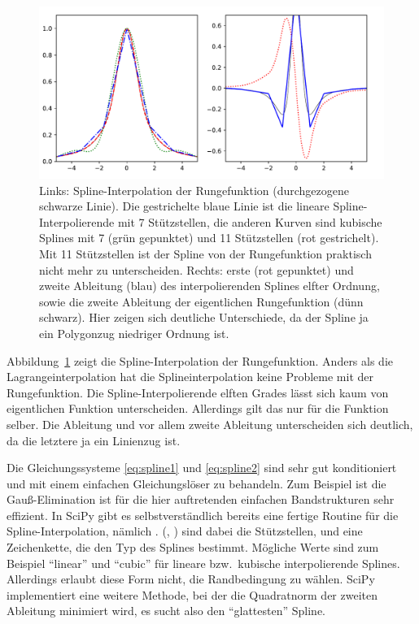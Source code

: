 \begin{figure}
  \centering
  \includegraphics[width=\textwidth]{plots/splines}
  \caption{Links: Spline-Interpolation der Rungefunktion
    (durchgezogene schwarze Linie). Die gestrichelte blaue Linie ist
    die lineare Spline-Interpolierende mit 7 Stützstellen, die anderen
    Kurven sind kubische Splines mit 7 (grün gepunktet) und 11
    Stützstellen (rot gestrichelt). Mit 11 Stützstellen ist der Spline
    von der Rungefunktion praktisch nicht mehr zu
    unterscheiden. Rechts: erste (rot gepunktet) und zweite Ableitung
    (blau) des interpolierenden Splines elfter Ordnung, sowie die
    zweite Ableitung der eigentlichen Rungefunktion (dünn
    schwarz). Hier zeigen sich deutliche Unterschiede, da der Spline
    ja ein Polygonzug niedriger Ordnung ist.}
  \label{fig:spline}
\end{figure}

Abbildung~\ref{fig:spline} zeigt die Spline-Interpolation der
Rungefunktion. Anders als die Lagrangeinterpolation hat die
Splineinterpolation keine Probleme mit der Rungefunktion. Die
Spline-Interpolierende elften Grades lässt sich kaum von eigentlichen
Funktion unterscheiden. Allerdings gilt das nur für die Funktion
selber. Die Ableitung und vor allem zweite Ableitung unterscheiden
sich deutlich, da die letztere ja ein Linienzug ist.

Die Gleichungssysteme \eqref{eq:spline1} und \eqref{eq:spline2} sind
sehr gut konditioniert und mit einem einfachen Gleichungslöser zu
behandeln.  Zum Beispiel ist die Gauß-Elimination ist für die hier
auftretenden einfachen Bandstrukturen sehr effizient. In SciPy gibt es
selbstverständlich bereits eine fertige Routine für die
Spline-Interpolation, nämlich . (, ) sind dabei die Stützstellen, und
 eine Zeichenkette, die den Typ des Splines
bestimmt. Mögliche Werte sind zum Beispiel "`linear"' und "`cubic"'
für lineare bzw.\ kubische interpolierende Splines. Allerdings erlaubt
diese Form nicht, die Randbedingung zu wählen. SciPy implementiert
eine weitere Methode, bei der die Quadratnorm der zweiten Ableitung
minimiert wird, es sucht also den \enquote{glattesten} Spline.

